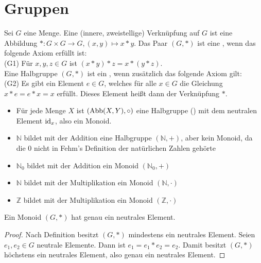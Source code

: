 \section{Gruppen}

\begin{definition}
	Sei $G$ eine Menge. Eine (innere, zweistellige) Verknüpfung
	auf $G$ ist eine Abbildung $*: G \times G \to G, (x,y) \mapsto x*y$. Das Paar $(G,*)$ ist eine
	, wenn das folgende Axiom erfüllt ist: \\
	(G1) Für $x,y,z \in G$ ist $(x*y)*z=x*(y*z)$. \\
	Eine Halbgruppe $(G,*)$ ist ein , wenn zusätzlich das folgende Axiom gilt: \\
	(G2) Es gibt ein Element $e \in G$, welches für alle $x \in G$ die Gleichung $x*e=e*x=x$
	erfüllt. Dieses Element heißt dann  der Verknüpfung $*$.  
\end{definition}

\begin{example}
	\begin{itemize}
		\item Für jede Menge $X$ ist $(\operatorname{Abb}(X,Y), \circ)$ eine Halbgruppe () mit dem neutralen Element
		$\operatorname{id}_x$, also ein Monoid.
		\item $\mathbb N$ bildet mit der Addition eine Halbgruppe $(\mathbb N,+)$, aber kein Monoid,
		da die 0 nicht in Fehm's Definition der natürlichen Zahlen gehörte
		\item $\mathbb N_0$ bildet mit der Addition ein Monoid $(\mathbb N_0,+)$
		\item $\mathbb N$ bildet mit der Multiplikation ein Monoid $(\mathbb N, \cdot)$
		\item $\mathbb Z$ bildet mit der Multiplikation ein Monoid $(\mathbb Z, \cdot)$
	\end{itemize}
\end{example}

\begin{proposition}
	Ein Monoid $(G,*)$ hat genau ein neutrales Element. 
\end{proposition}
\begin{proof}
	Nach Definition besitzt $(G,*)$ mindestens ein neutrales Element. Seien $e_1,e_2\in G$ neutrale Elemente. Dann 
	ist $e_1=e_1 * e_2=e_2$. Damit besitzt $(G,*)$ höchstens ein neutrales Element, also genau ein neutrales Element.
\end{proof}


